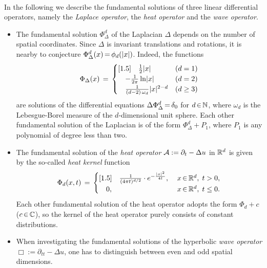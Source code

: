 \documentclass[11pt,twoside]{article}
\begin{document}
\paragraph{} %
In the following we describe the fundamental solutions
of three linear differential operators,
namely
the \textit{Laplace operator},
the \textit{heat operator} and
the \textit{wave operator}.

\begin{itemize}
\item[1.]
The fundamental solution $\Phi_{\Delta}^d$ of the Laplacian $\Delta$
depends on the number of spatial coordinates.
Since $\Delta$ is invariant {\wrt} translations and rotations,
it is nearby to conjecture $\Phi_{\Delta}^d(x) \eq \phi_d(\abs{x} )$.
Indeed,
the functions 
\[
\Phi_{\Delta}(x) \=
\begin{cases}[1.5]
\quad \frac{1}{2} \abs{x}                         & (d=1)      \\
\quad - \frac{1}{2 \pi} \ln \abs{x}               & (d=2)      \\
\quad \frac{1}{(d-2) \, \omega_d } \abs{x} ^{2-d} & (d \geq 3) \\
\end{cases}
\]
are solutions of the differential equations
$\Delta \Phi_{\Delta}^d {\,=\,} \delta_0$ for $d {\,\in\,} {\mathbb{N}}$,
where $\omega_d$ is the Lebesgue-Borel measure of
the $d$-dimensional unit sphere.
Each other fundamental solution of the Laplacian is of the form
$\Phi_{\Delta}^d + P_1$,
where $P_1$ is any polynomial of degree less than two.

\item[2.]
The fundamental solution of the \textit{heat operator} 
${\mathcal{A}} := \partial_t - \Delta u$ in ${\mathbb{R}}^d$ is given 
by the so-called \textit{heat kernel} function
\[
\Phi_d(x,t) \=
\begin{cases}[1.5]
\quad \frac{1}{(4 \pi t)^{d/2}} \cdot e^{- \frac{\abs{x} ^2}{4t}},
         & \; x \xeof \Rd, \; t > 0,   \\
\quad 0, & \; x \xeof \Rd, \; t \leq 0.\\
\end{cases}
\]
Each other fundamental solution of the heat operator
adopts the form $\Phi_d + c$ ($c {\,\in\,} {\mathbb{C}}$),
so the kernel of the heat operator 
purely consists of constant distributions.

\item[3.]
When investigating the fundamental solutions
of the hyperbolic \textit{wave operator} $\Box := \partial_{tt} - \Delta u$,
one has to distinguish between even and odd spatial dimensions.


\end{itemize}
\end{document}
